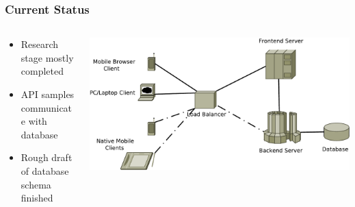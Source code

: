 \documentclass[utf8]{beamer}
\begin{document}
\begin{frame}
\frametitle{Current Status}
\begin{columns}
	\begin{column}{0.6\textwidth}
	\begin{itemize}
		\item Research stage mostly completed
		\item API samples communicate with database
		\item Rough draft of database schema finished
	\end{itemize}
	\end{column}

	\begin{column}{0.4\textwidth}
		\includegraphics[width=\textwidth]{img/arch.pdf}
	\end{column}
\end{columns}
\end{frame}
\end{document}
